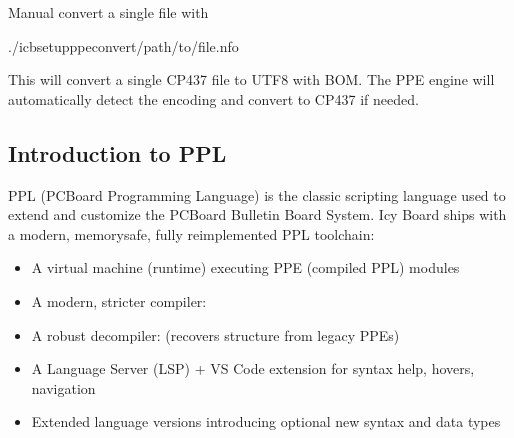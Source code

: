 \documentclass[letterpaper,10pt,english]{sphinxmanual}
\begin{document}
\sphinxAtStartPar
Manual convert a single file with

\begin{sphinxVerbatim}[commandchars=\\\{\}]
./icbsetupppe\PYGZhy{}convert/path/to/file.nfo
\end{sphinxVerbatim}

\sphinxAtStartPar
This will convert a single CP437 file to UTF\sphinxhyphen{}8 with BOM. The PPE engine will automatically detect the encoding and convert to CP437 if needed.

\sphinxstepscope


\subsection{Introduction to PPL}
\label{\detokenize{ppl:introduction-to-ppl}}\label{\detokenize{ppl::doc}}
\sphinxAtStartPar
PPL (PCBoard Programming Language) is the classic scripting language
used to extend and customize the PCBoard Bulletin Board System.
Icy Board ships with a modern, memory\sphinxhyphen{}safe, fully reimplemented PPL toolchain:
\begin{itemize}
\item {} 
\sphinxAtStartPar
A virtual machine (runtime) executing PPE (compiled PPL) modules

\item {} 
\sphinxAtStartPar
A modern, stricter compiler: 

\item {} 
\sphinxAtStartPar
A robust decompiler:  (recovers structure from legacy PPEs)

\item {} 
\sphinxAtStartPar
A Language Server (LSP) + VS Code extension for syntax help, hovers, navigation

\item {} 
\sphinxAtStartPar
Extended language versions introducing optional new syntax and data types

\end{itemize}
\end{document}
